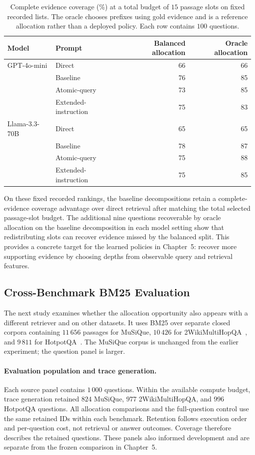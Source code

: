 \begin{table}[htbp]
\centering
\caption{Complete evidence coverage (\%) at a total budget of $15$ passage
slots on fixed recorded lists. The oracle chooses prefixes using gold evidence
and is a reference allocation rather than a deployed policy. Each row contains
$100$ questions.}
\label{tab:ch4-budget}
\begin{tabular}{llrr}
\hline
Model & Prompt & Balanced allocation & Oracle allocation \\
\hline
GPT-4o-mini & Direct & 66 & 66 \\
 & Baseline & 76 & 85 \\
 & Atomic-query & 73 & 85 \\
 & Extended-instruction & 75 & 83 \\
\hline
Llama-3.3-70B & Direct & 65 & 65 \\
 & Baseline & 78 & 87 \\
 & Atomic-query & 75 & 88 \\
 & Extended-instruction & 75 & 85 \\
\hline
\end{tabular}
\end{table}

On these fixed recorded rankings, the baseline decompositions retain a complete-evidence 
coverage advantage over direct retrieval after matching the total selected passage-slot budget. 
The additional nine questions recoverable by oracle allocation on the baseline decomposition in
each model setting show that redistributing slots can recover evidence missed
by the balanced split. This provides a concrete target for the learned policies in
Chapter~5: recover more supporting evidence by choosing depths from
observable query and retrieval features.

\subsection{Cross-Benchmark BM25 Evaluation}
\label{sec:ch4-bm25}

The next study examines whether the allocation opportunity also appears with
a different retriever and on other datasets. It uses BM25 over separate
closed corpora containing $11\,656$ passages for MuSiQue, $10\,426$ for
2WikiMultiHopQA~\cite{ho2020constructing}, and $9\,811$ for
HotpotQA~\cite{yang2018hotpotqa}. The MuSiQue corpus is unchanged from the
earlier experiment; the question panel is larger.

\paragraph{Evaluation population and trace generation.}
Each source panel contains $1\,000$ questions. Within the available compute
budget, trace generation retained $824$ MuSiQue, $977$ 2WikiMultiHopQA,
and $996$ HotpotQA questions. All allocation comparisons and the
full-question control use the same retained IDs within each benchmark.
Retention follows execution order and per-question cost, not retrieval or
answer outcomes. Coverage therefore describes the retained questions. These
panels also informed development and are separate from the frozen comparison
in Chapter~5.

